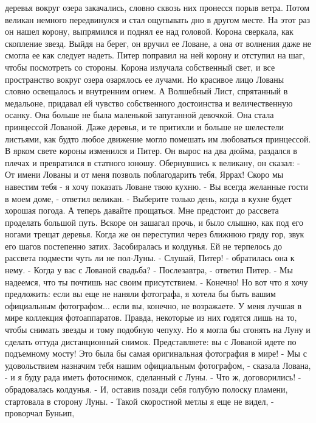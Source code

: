 деревья вокруг озера закачались, словно сквозь них пронесся порыв 
ветра.
    Потом великан немного передвинулся и стал ощупывать дно в другом 
месте. На этот раз он нашел корону, выпрямился и поднял ее над 
головой. Корона сверкала, как скопление звезд. Выйдя на берег, он 
вручил ее Ловане, а она от волнения даже не смогла ее как следует 
надеть. Питер поправил на ней корону и отступил на шаг, чтобы 
посмотреть со стороны.
    Корона излучала собственный свет, и все пространство вокруг озера 
озарялось ее лучами. Но красивое лицо Лованы словно освещалось и 
внутренним огнем. А Волшебный Лист, спрятанный в медальоне, придавал 
ей чувство собственного достоинства и величественную осанку. Она 
больше не была маленькой запуганной девочкой. Она стала принцессой 
Лованой.
    Даже деревья, и те притихли и больше не шелестели листьями, как 
будто любое движение могло помешать им любоваться принцессой.
    В ярком свете короны изменился и Питер. Он вырос на два дюйма, 
раздался в плечах и превратился в статного юношу. Обернувшись к 
великану, он сказал:
    - От имени Лованы и от меня позволь поблагодарить тебя, Яррах! 
Скоро мы навестим тебя - я хочу показать Ловане твою кухню.
    - Вы всегда желанные гости в моем доме, - ответил великан. - 
Выберите только день, когда в кухне будет хорошая погода. А теперь 
давайте прощаться. Мне предстоит до рассвета проделать большой путь.
    Вскоре он зашагал прочь, и было слышно, как под его ногами трещат 
деревья. Когда же он переступил через ближнюю гряду гор, звук его 
шагов постепенно затих.
    Засобиралась и колдунья. Ей не терпелось до рассвета подмести чуть 
ли не пол-Луны.
    - Слушай, Питер! - обратилась она к нему. - Когда у вас с Лованой 
свадьба?
    - Послезавтра, - ответил Питер. - Мы надеемся, что ты почтишь нас 
своим присутствием.
    - Конечно! Но вот что я хочу предложить: если вы еще не наняли 
фотографа, я хотела бы быть вашим официальным фотографом... если вы, 
конечно, не возражаете. У меня лучшая в мире коллекция фотоаппаратов. 
Правда, некоторые из них годятся лишь на то, чтобы снимать звезды и 
тому подобную чепуху. Но я могла бы сгонять на Луну и сделать оттуда 
дистанционный снимок. Представляете: вы с Лованой идете по подъемному 
мосту! Это была бы самая оригинальная фотография в мире!
    - Мы с удовольствием назначим тебя нашим официальным фотографом, - 
сказала Лована, - и я буду рада иметь фотоснимок, сделанный с Луны.
    - Что ж, договорились! - обрадовалась колдунья. - И, оставив 
позади себя голубую полоску пламени, стартовала в сторону Луны.
    - Такой скоростной метлы я еще не видел, - проворчал Буньип, 
